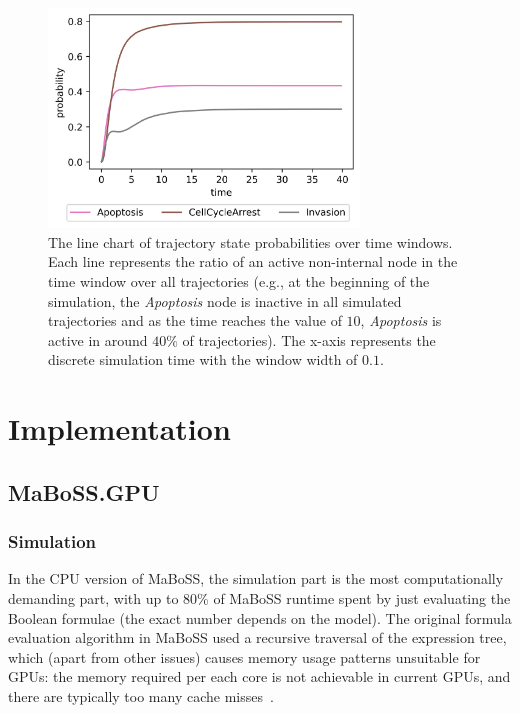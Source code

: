 \documentclass[sn-mathphys-num]{sn-jnl}%
\begin{document}
\begin{figure}
    \centering
    \includegraphics[width=3.25in]{img/cohen_nodes_trajs.png}
    \caption{The line chart of trajectory state probabilities over time windows. Each line represents the ratio of an active non-internal node in the time window over all trajectories (e.g., at the beginning of the simulation, the \emph{Apoptosis} node is inactive in all simulated trajectories and as the time reaches the value of $10$, \emph{Apoptosis} is active in around $40\%$ of trajectories). The x-axis represents the discrete simulation time with the window width of $0.1$.}
    \label{fig:cohen_traj}
\end{figure}

\section{Implementation}\label{sec:implementation}

\subsection{MaBoSS.GPU}

\subsubsection*{Simulation}

In the CPU version of MaBoSS, the simulation part is the most computationally demanding part, with up to 80\% of MaBoSS runtime spent by just evaluating the Boolean formulae (the exact number depends on the model). The original formula evaluation algorithm in MaBoSS used a recursive traversal of the expression tree, which (apart from other issues) causes memory usage patterns unsuitable for GPUs: the memory required per each core is not achievable in current GPUs, and there are typically too many cache misses~\cite{karlsson2000prefetching}.
\end{document}
